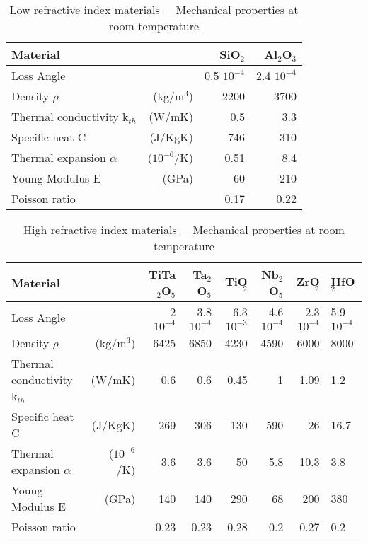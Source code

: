 \begin{table}
\begin{tabular}{|l r||r|r|}
  \hline
    {\large\strut} Material  & & SiO$_2$ & Al$_2$O$_3$ \\
  \hline
  \hline
   {\large\strut} Loss Angle & & 0.5 $10^{-4}$ & 2.4 $10^{-4}$  \\
   {\large\strut} Density $\rho$ & (kg/m$^3$) & 2200 & 3700 \\
   {\large\strut} Thermal conductivity k$_{th}$ & (W/mK) & 0.5  & 3.3 \\
   {\large\strut} Specific heat C & (J/KgK) & 746  & 310 \\
   {\large\strut} Thermal expansion $\alpha$ & ($10^{-6}$/K) &  0.51  & 8.4 \\
   {\large\strut} Young Modulus E & (GPa) &  60 & 210\\
   {\large\strut} Poisson ratio & & 0.17 & 0.22 \\
  \hline
\end{tabular}
\caption{Low refractive index materials _ Mechanical properties at room temperature}
\label{tab:Mech_CoatLowRef_Param}
\end{table}

\begin{table}
\begin{center}
\begin{tabular}{|l r||r|r|r|r|r|}
  \hline
    {\large\strut} Material  & & TiTa$_2$O$_5$ & Ta$_2$O$_5$ & TiO$_2$ & Nb$_2$O$_5$ & ZrO$_2$ & HfO$_2$ \\
  \hline
  \hline
   {\large\strut} Loss Angle & &  2 $10^{-4}$ & 3.8 $10^{-4}$  & 6.3 $10^{-3}$ & 4.6 $10^{-4}$ & 2.3 $10^{-4}$ & 5.9 $10^{-4}$  \\
   {\large\strut} Density $\rho$ & (kg/m$^3$) & 6425 & 6850 & 4230 & 4590 & 6000 & 8000 \\
   {\large\strut} Thermal conductivity k$_{th}$ & (W/mK) & 0.6 & 0.6 & 0.45 & 1 & 1.09 & 1.2 \\
   {\large\strut} Specific heat C & (J/KgK) & 269 & 306 & 130 & 590 & 26 & 16.7 \\
   {\large\strut} Thermal expansion $\alpha$ & ($10^{-6}$/K) & 3.6 & 3.6 & 50 & 5.8 & 10.3 & 3.8 \\
   {\large\strut} Young Modulus E & (GPa) & 140 & 140 & 290 & 68 & 200 & 380 \\
   {\large\strut} Poisson ratio & & 0.23 & 0.23 & 0.28 & 0.2 & 0.27 & 0.2 \\
  \hline
\end{tabular}
\end{center}
\caption{High refractive index materials _ Mechanical properties at room temperature}
\label{tab:Mech_CoatHighRef_Param}
\end{table}

